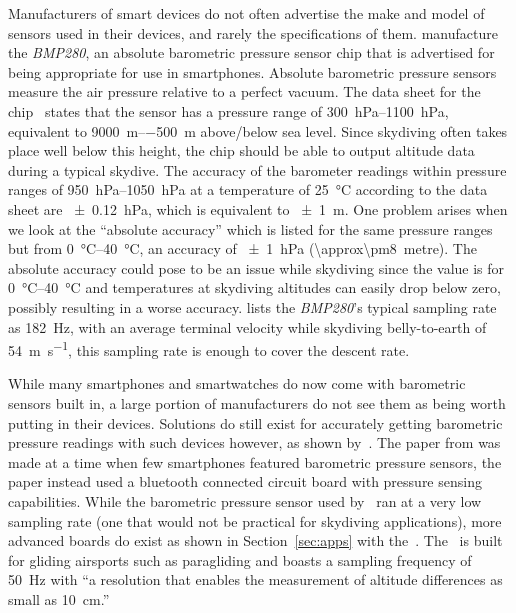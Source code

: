 \documentclass[11pt, twocolumn]{article}
\newcommand{\hPa}{\hecto\pascal} %
\begin{document}
Manufacturers of smart devices do not often advertise the make and model of sensors used in their devices, and rarely the specifications of them. \citeauthor{bosch_bmp280:_2016} manufacture the \textit{BMP280}, an absolute barometric pressure sensor chip that is advertised for being appropriate for use in smartphones. Absolute barometric pressure sensors measure the air pressure relative to a perfect vacuum. The data sheet for the chip~\cite{bosch_bmp280:_2016} states that the sensor has a pressure range of \SIrange{300}{1100}{\hPa}, equivalent to \SIrange{+9000}{-500}{\metre} above/below sea level. Since skydiving often takes place well below this height, the chip should be able to output altitude data during a typical skydive. The accuracy of the barometer readings within pressure ranges of \SIrange{950}{1050}{\hPa} at a temperature of \SI{25}{\degreeCelsius} according to the data sheet are \SI{\pm0.12}{\hPa}, which is equivalent to \SI{\pm1}{\metre}. One problem arises when we look at the ``absolute accuracy'' which is listed for the same pressure ranges but from \SIrange{0}{40}{\degreeCelsius}, an accuracy of \SI{\pm1}{\hPa} (\SI{\approx\pm8}{metre}). The absolute accuracy could pose to be an issue while skydiving since the value is for \SIrange{0}{40}{\degreeCelsius} and temperatures at skydiving altitudes can easily drop below zero, possibly resulting in a worse accuracy. \citeauthor{bosch_bmp280:_2016} lists the \textit{BMP280}'s typical sampling rate as \SI{182}{\Hz}, with an average terminal velocity while skydiving belly-to-earth of \SI{54}{\metre\per\second}, this sampling rate is enough to cover the descent rate.

While many smartphones and smartwatches do now come with barometric sensors built in, a large portion of manufacturers do not see them as being worth putting in their devices. Solutions do still exist for accurately getting barometric pressure readings with such devices however, as shown by~\textcite{he_atmospheric_2012}. The paper from \citeyear{he_atmospheric_2012} was made at a time when few smartphones featured barometric pressure sensors, the paper instead used a bluetooth connected circuit board with pressure sensing capabilities. While the barometric pressure sensor used by~\textcite{he_atmospheric_2012} ran at a very low sampling rate (one that would not be practical for skydiving applications), more advanced boards do exist as shown in Section~\ref{sec:apps} with the~.
The~ is built for gliding airsports such as paragliding and boasts a sampling frequency of \SI{50}{\Hz} with ``a resolution that enables the measurement of altitude differences as small as \SI{10}{\cm}.''
\end{document}
